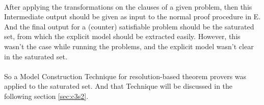		\paragraph{}
		After applying the transformations on the clauses of a given problem, then this Intermediate output should be given as input to the normal proof procedure in E. And the final output for a (counter) satisfiable problem should be the saturated set, from which the explicit model should be extracted easily. However, this wasn't the case while running the problems, and the explicit model wasn't clear in the saturated set.
		
		\paragraph{}
		So a Model Construction Technique for resolution-based theorem provers was applied to the saturated set. And that Technique will be discussed in the following section \ref{sec:c3s2}.